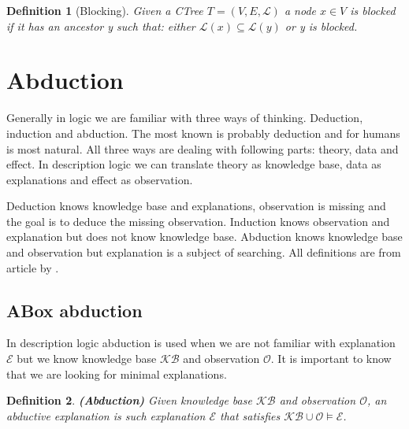 \documentclass[12pt,a4paper]{article}
\newtheorem{definition}{Definition}[subsection]
\newtheorem{example}{Example}[subsection]
\begin{document}
\begin{definition}[Blocking]
Given a CTree $T = (V, E, \mathcal{L})$ a node $x \in V$ is blocked if it has an ancestor y such that: either $\mathcal{L}(x) \subseteq \mathcal{L}(y)$ or y is blocked.

\end{definition}

 


\section{Abduction}
Generally in logic we are familiar with three ways of thinking. Deduction, induction and abduction. The most known is probably deduction and for humans is most natural. All three ways are dealing with following parts: theory, data and effect. In description logic we can translate theory as knowledge base, data as explanations and  effect as observation.

Deduction knows knowledge base and explanations, observation is missing and the goal is to deduce the missing observation. Induction knows observation and explanation but does not know knowledge base. Abduction knows knowledge base and observation but explanation is a subject of searching. All definitions are from article by \citep{pukancovaAboxAbduction}.

\subsection{ABox abduction}
In description logic abduction is used when we are not familiar with explanation $\mathcal{E}$ but we know knowledge base $\mathcal{KB}$ and observation $\mathcal{O}$. It is important to know that we are looking for minimal explanations.

\begin{definition}{\textbf{(Abduction)}} 
	Given knowledge base $\mathcal{KB}$ and observation $\mathcal{O}$, an abductive explanation is such explanation $\mathcal{E}$ that satisfies $\mathcal{KB} \cup \mathcal{O} \models \mathcal{E}$.
\end{definition}
\end{document}
